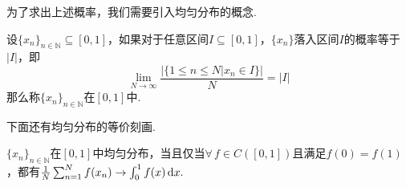 为了求出上述概率，我们需要引入均匀分布的概念.\par

\begin{definition}[均匀分布]    
    设$\{x_n\}_{n\in\mathbb{N}} \subseteq [0,1]$，如果对于任意区间$I \subseteq [0,1]$，$\{x_n\}$落入区间$I$的概率等于$|I|$，即
    \[\lim_{N\to\infty}{\frac{\Big|\big\{1\leqslant n \leqslant N|x_n \in I\big\}\Big|}{N}} = |I|\]
    那么称$\{x_n\}_{n\in\mathbb{N}}$在$[0,1]$中.
\end{definition}

下面还有均匀分布的等价刻画.
\begin{proposition}[均匀分布的等价刻画]
    $\{x_n\}_{n\in\mathbb{N}}$在$[0,1]$中均匀分布，当且仅当$\forall\, f\in C([0,1])$且满足$f(0)=f(1)$，都有$\frac{1}{N}\sum_{n=1}^N{f(x_n)}\to \int_{0}^{1}{f(x)}\mathop{}\!\mathrm{d} x.$
\end{proposition}
